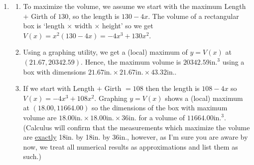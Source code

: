 \begin{enumerate}
\item \begin{enumerate}

\item To maximize the volume, we assume we start with the maximum Length $+$ Girth of $130$,  so the length is $130 - 4x$.  The volume of a rectangular box is  `length $\times$ width $\times$ height' so we get $V(x) = x^{2}(130 - 4x) = -4x^{3} + 130x^{2}$.  

\item Using a graphing utility, we get a (local) maximum of  $y = V(x)$ at $(21.67, 20342.59)$.  Hence, the maximum volume is $20342.59\mbox{in.}^{3}$ using a box with dimensions $21.67\mbox{in.} \times 21.67\mbox{in.} \times 43.32\mbox{in.}$.

\item If we start with Length $+$ Girth $= 108$ then the length is $108 - 4x$ so  $V(x) = -4x^{3} + 108x^{2}$.  Graphing $y = V(x)$  shows a (local) maximum at $(18.00, 11664.00)$ so the dimensions of the box with maximum volume are $18.00\mbox{in.} \times 18.00\mbox{in.} \times 36\mbox{in.}$ for a volume of $11664.00\mbox{in.}^{3}$.  (Calculus will confirm that the measurements which maximize the volume are \underline{exactly} 18in. by 18in. by 36in., however, as I'm sure you are aware by now, we treat all numerical results as approximations and list them as such.)

\end{enumerate}

\setcounter{HW}{\value{enumi}}
\end{enumerate}




